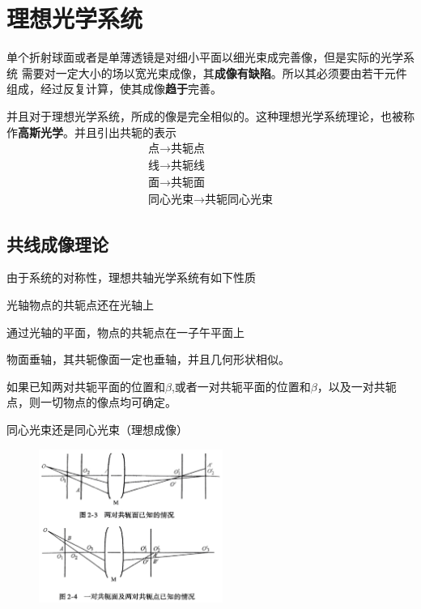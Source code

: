 \section{理想光学系统}
单个折射球面或者是单薄透镜是对细小平面以细光束成完善像，但是实际的光学系统
需要对一定大小的场以宽光束成像，其\textbf{成像有缺陷}。所以其必须要由若干元件组成，经过反复计算，使其成像\textbf{趋于}完善。

并且对于理想光学系统，所成的像是完全相似的。这种理想光学系统理论，也被称作\textbf{高斯光学}。并且引出共轭的表示
\begin{align}
    \text{点} \to \text{共轭点} \tag{3.0.a}\\
    \text{线} \to \text{共轭线} \tag{3.0.b}\\
    \text{面} \to \text{共轭面} \tag{3.0.c}\\
    \text{同心光束} \to \text{共轭同心光束} \tag{3.0.d}
\end{align}
\subsection{共线成像理论}
由于系统的对称性，理想共轴光学系统有如下性质
\begin{description}[leftmargin=1.7cm,style=nextline,nosep]%
    \item[光轴] 光轴物点的共轭点还在光轴上
    \item[子午平面] 通过光轴的平面，物点的共轭点在一子午平面上
    \item[垂轴平面] 物面垂轴，其共轭像面一定也垂轴，并且几何形状相似。
    \item[表示] 如果已知两对共轭平面的位置和$\beta$,或者一对共轭平面的位置和$\beta$，以及一对共轭点，则一切物点的像点均可确定。    
    \item[同心] 同心光束还是同心光束（理想成像） 
\end{description}
        \begin{figure}[H]
            \centering
            \includegraphics[width=6cm]{img/2.1.png}
            \end{figure}
